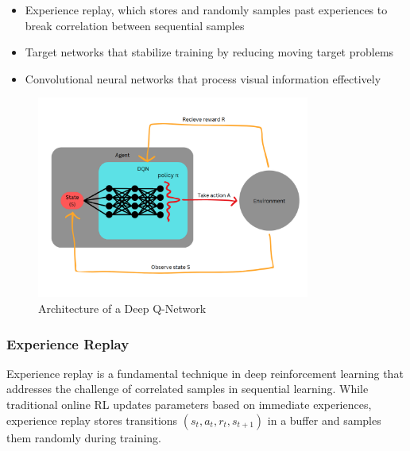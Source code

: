 \begin{itemize}
    \item Experience replay, which stores and randomly samples past experiences to break correlation between sequential samples
    \item Target networks that stabilize training by reducing moving target problems
    \item Convolutional neural networks that process visual information effectively
\end{itemize}

\begin{figure}[H]
    \centering
    \includegraphics[width=0.8\textwidth]{figures/dqn_architecture}
    \caption{Architecture of a Deep Q-Network}
    \label{fig:dqn-architecture}
\end{figure}

\subsubsection{Experience Replay}

Experience replay is a fundamental technique in deep reinforcement learning that addresses the challenge of correlated samples in sequential learning. 
While traditional online RL updates parameters based on immediate experiences, experience replay stores transitions $(s_t, a_t, r_t, s_{t+1})$ in a buffer and samples them randomly during training.

